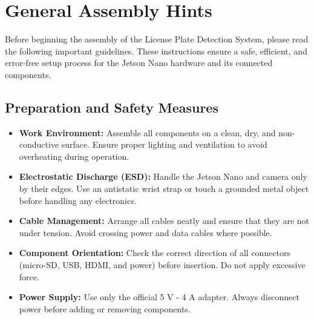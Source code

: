 %
%
%




\chapter{General Assembly Hints}

Before beginning the assembly of the License Plate Detection System, please read the following important guidelines.  
These instructions ensure a safe, efficient, and error-free setup process for the Jetson Nano hardware and its connected components.

\section*{Preparation and Safety Measures}

\begin{itemize}
	\item \textbf{Work Environment:}  
	Assemble all components on a clean, dry, and non-conductive surface. Ensure proper lighting and ventilation to avoid overheating during operation.
	
	\item \textbf{Electrostatic Discharge (ESD):}  
	Handle the Jetson Nano and camera only by their edges. Use an antistatic wrist strap or touch a grounded metal object before handling any electronics.
	
	\item \textbf{Cable Management:}  
	Arrange all cables neatly and ensure that they are not under tension. Avoid crossing power and data cables where possible.
	
	\item \textbf{Component Orientation:}  
	Check the correct direction of all connectors (micro-SD, USB, HDMI, and power) before insertion. Do not apply excessive force.
	
	\item \textbf{Power Supply:}  
	Use only the official 5 V -  4 A adapter. Always disconnect power before adding or removing components.
\end{itemize}


